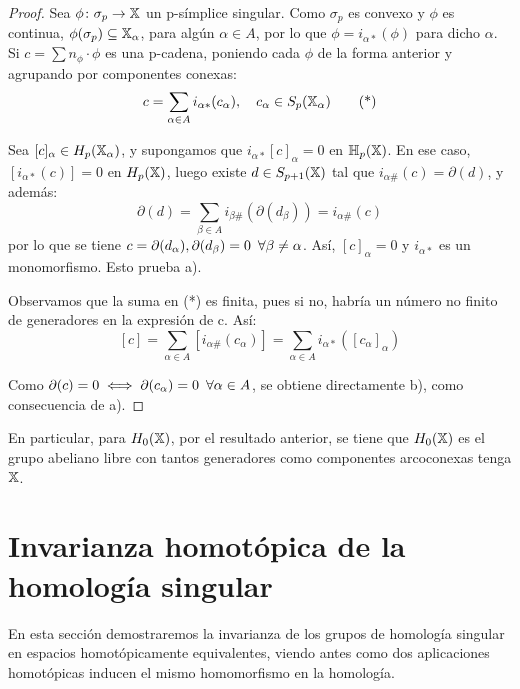 \begin{proof}
  Sea $\phi \colon \sigma_p \to {\mathbb X}$ un p-símplice singular. Como $\sigma_p$ es convexo y $\phi$ es continua, $\phi(\sigma_p) \subseteq {\mathbb X}_\alpha$, para algún
  $\alpha \in A$, por lo que $\phi = i_{\alpha*}(\phi)$ para dicho $\alpha$. \\
  Si $c = \sum n_\phi \cdot \phi$ es una p-cadena, poniendo cada $\phi$ de la forma anterior y agrupando por componentes conexas:
  \begin{equation}
    c = \sum\limits_{\alpha \in A} i_{\alpha*}(c_\alpha), \quad c_\alpha \in S_p({\mathbb X}_\alpha)  \tag{*}
  \end{equation}

  Sea $[c]_\alpha \in H_p({\mathbb X}_\alpha)$, y supongamos que $i_{\alpha*}[c]_\alpha = 0$ en ${\mathbb H}_p({\mathbb X})$. En ese caso, $[i_{\alpha*}(c)] = 0$ en $H_p({\mathbb X})$,
  luego existe $d \in S_{p+1}({\mathbb X})$ tal que $i_{\alpha\#}(c) = \partial(d)$, y además:
  \[\partial(d) = \sum\limits_{\beta \in A} i_{\beta\#}(\partial(d_\beta)) = i_{\alpha\#}(c) \]
  por lo que se tiene $c = \partial(d_\alpha), \partial(d_\beta) = 0 \hspace{0.5em} \forall \beta \neq \alpha$. Así, $[c]_\alpha = 0$ y $i_{\alpha*}$ es un monomorfismo.
  Esto prueba a).

  Observamos que la suma en (*) es finita, pues si no, habría un número no finito de generadores en la expresión de c. Así:
  \[  [c] = \sum\limits_{\alpha \in A} [i_{\alpha\#}(c_\alpha)] =  \sum\limits_{\alpha \in A} i_{\alpha*}([c_\alpha]_\alpha)\]

  Como $\partial(c) = 0 \iff \partial(c_\alpha) = 0 \hspace{0.5em} \forall \alpha \in A$, se obtiene directamente b), como consecuencia de a).
\end{proof}

En particular, para $H_0({\mathbb X})$, por el resultado anterior, se tiene que $H_0({\mathbb X})$ es el grupo abeliano libre con tantos generadores como
componentes arcoconexas tenga ${\mathbb X}$.

\section{Invarianza homotópica de la homología singular}

En esta sección demostraremos la invarianza de los grupos de homología singular en espacios homotópicamente equivalentes, viendo antes como
dos aplicaciones homotópicas inducen el mismo homomorfismo en la homología.


